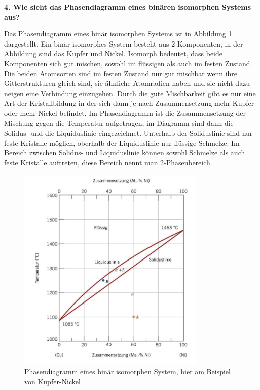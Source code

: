 \noindent\textbf{4. Wie sieht das Phasendiagramm eines binären isomorphen Systems aus?}\\
\begin{addmargin}[25pt]{0pt}
Das Phasendiagramm eines binär isomorphen Systems ist in Abbildung \ref{fig:Phasendiagramm_binar_isomorph} dargestellt. Ein binär isomorphes System besteht aus 2 Komponenten, in der Abbildung sind das Kupfer und Nickel. Isomorph bedeutet, dass beide Komponenten sich gut mischen, sowohl im flüssigen als auch im festen Zustand. Die beiden Atomsorten sind im festen Zustand nur gut mischbar wenn ihre Gitterstrukturen gleich sind, sie ähnliche Atomradien haben und sie nicht dazu neigen eine Verbindung einzugehen. Durch die gute Mischbarkeit gibt es nur eine Art der Kristallbildung in der sich dann je nach Zusammensetzung mehr Kupfer oder mehr Nickel befindet. Im Phasendiagramm ist die Zusammensetzung der Mischung gegen die Temperatur aufgetragen, im Diagramm sind dann die Solidus- und die Liquiduslinie eingezeichnet. Unterhalb der Soliduslinie sind nur feste Kristalle möglich, oberhalb der Liquiduslinie nur flüssige Schmelze. Im Bereich zwischen Solidus- und Liquiduslinie können sowohl Schmelze als auch feste Kristalle auftreten, diese Bereich nennt man 2-Phasenbereich.\\
\begin{figure}[h]
    \centering
    \includegraphics[width = 0.8\textwidth]{images/Materialwissenschaften/Phasendiagramm_binar_isomorph.jpeg}
    \caption{Phasendiagramm eines binär isomorphen System, hier am Beispiel von Kupfer-Nickel}
    \label{fig:Phasendiagramm_binar_isomorph}
\end{figure}
\end{addmargin}


